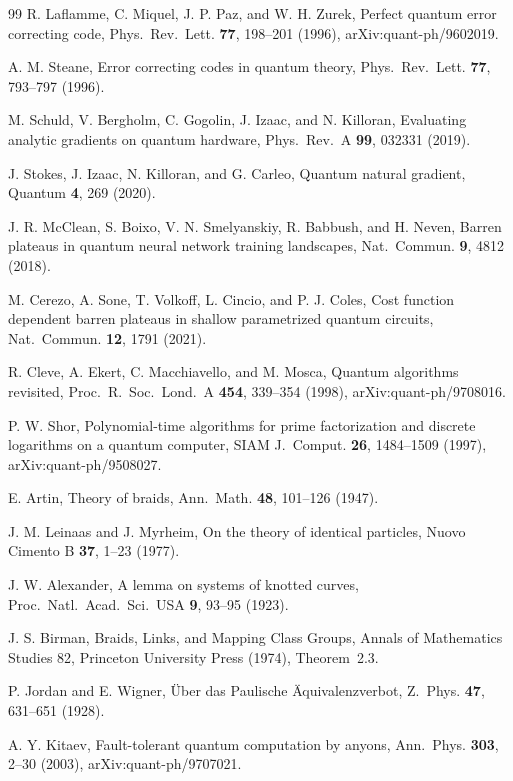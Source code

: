 \documentclass[aps,pra,onecolumn,superscriptaddress,nofootinbib,10pt]{revtex4-2}
\theoremstyle{definition}
\theoremstyle{remark}
\begin{document}
\begin{thebibliography}{99}
 R. Laflamme, C. Miquel, J. P. Paz, and W. H. Zurek, Perfect quantum error correcting code, Phys.\ Rev.\ Lett. \textbf{77}, 198--201 (1996), arXiv:quant-ph/9602019.

 A. M. Steane, Error correcting codes in quantum theory, Phys.\ Rev.\ Lett. \textbf{77}, 793--797 (1996).

 M. Schuld, V. Bergholm, C. Gogolin, J. Izaac, and N. Killoran, Evaluating analytic gradients on quantum hardware, Phys.\ Rev.\ A \textbf{99}, 032331 (2019).

 J. Stokes, J. Izaac, N. Killoran, and G. Carleo, Quantum natural gradient, Quantum \textbf{4}, 269 (2020).

 J. R. McClean, S. Boixo, V. N. Smelyanskiy, R. Babbush, and H. Neven, Barren plateaus in quantum neural network training landscapes, Nat.\ Commun. \textbf{9}, 4812 (2018).

 M. Cerezo, A. Sone, T. Volkoff, L. Cincio, and P. J. Coles, Cost function dependent barren plateaus in shallow parametrized quantum circuits, Nat.\ Commun. \textbf{12}, 1791 (2021).

 R. Cleve, A. Ekert, C. Macchiavello, and M. Mosca, Quantum algorithms revisited, Proc.\ R.\ Soc.\ Lond.\ A \textbf{454}, 339--354 (1998), arXiv:quant-ph/9708016.

 P. W. Shor, Polynomial-time algorithms for prime factorization and discrete logarithms on a quantum computer, SIAM J.\ Comput. \textbf{26}, 1484--1509 (1997), arXiv:quant-ph/9508027.

 E. Artin, Theory of braids, Ann.\ Math. \textbf{48}, 101--126 (1947).

 J. M. Leinaas and J. Myrheim, On the theory of identical particles, Nuovo Cimento B \textbf{37}, 1--23 (1977).

 J. W. Alexander, A lemma on systems of knotted curves, Proc.\ Natl.\ Acad.\ Sci.\ USA \textbf{9}, 93--95 (1923).

 J. S. Birman, Braids, Links, and Mapping Class Groups, Annals of Mathematics Studies 82, Princeton University Press (1974), Theorem~2.3.

 P. Jordan and E. Wigner, \"Uber das Paulische \"Aquivalenzverbot, Z.\ Phys. \textbf{47}, 631--651 (1928).

 A. Y. Kitaev, Fault-tolerant quantum computation by anyons, Ann.\ Phys. \textbf{303}, 2--30 (2003), arXiv:quant-ph/9707021.


\end{thebibliography}
\end{document}
